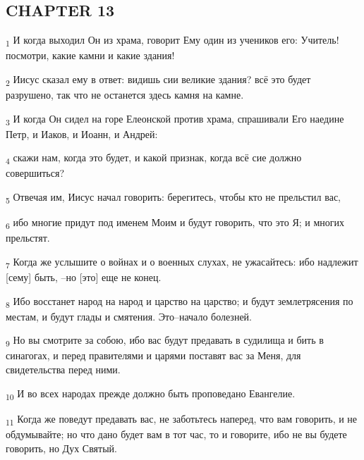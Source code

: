\subsection{CHAPTER 13}
\begin{tcolorbox}
\textsubscript{1} И когда выходил Он из храма, говорит Ему один из учеников его: Учитель! посмотри, какие камни и какие здания!
\end{tcolorbox}
\begin{tcolorbox}
\textsubscript{2} Иисус сказал ему в ответ: видишь сии великие здания? всё это будет разрушено, так что не останется здесь камня на камне.
\end{tcolorbox}
\begin{tcolorbox}
\textsubscript{3} И когда Он сидел на горе Елеонской против храма, спрашивали Его наедине Петр, и Иаков, и Иоанн, и Андрей:
\end{tcolorbox}
\begin{tcolorbox}
\textsubscript{4} скажи нам, когда это будет, и какой признак, когда всё сие должно совершиться?
\end{tcolorbox}
\begin{tcolorbox}
\textsubscript{5} Отвечая им, Иисус начал говорить: берегитесь, чтобы кто не прельстил вас,
\end{tcolorbox}
\begin{tcolorbox}
\textsubscript{6} ибо многие придут под именем Моим и будут говорить, что это Я; и многих прельстят.
\end{tcolorbox}
\begin{tcolorbox}
\textsubscript{7} Когда же услышите о войнах и о военных слухах, не ужасайтесь: ибо надлежит [сему] быть, --но [это] еще не конец.
\end{tcolorbox}
\begin{tcolorbox}
\textsubscript{8} Ибо восстанет народ на народ и царство на царство; и будут землетрясения по местам, и будут глады и смятения. Это--начало болезней.
\end{tcolorbox}
\begin{tcolorbox}
\textsubscript{9} Но вы смотрите за собою, ибо вас будут предавать в судилища и бить в синагогах, и перед правителями и царями поставят вас за Меня, для свидетельства перед ними.
\end{tcolorbox}
\begin{tcolorbox}
\textsubscript{10} И во всех народах прежде должно быть проповедано Евангелие.
\end{tcolorbox}
\begin{tcolorbox}
\textsubscript{11} Когда же поведут предавать вас, не заботьтесь наперед, что вам говорить, и не обдумывайте; но что дано будет вам в тот час, то и говорите, ибо не вы будете говорить, но Дух Святый.
\end{tcolorbox}
